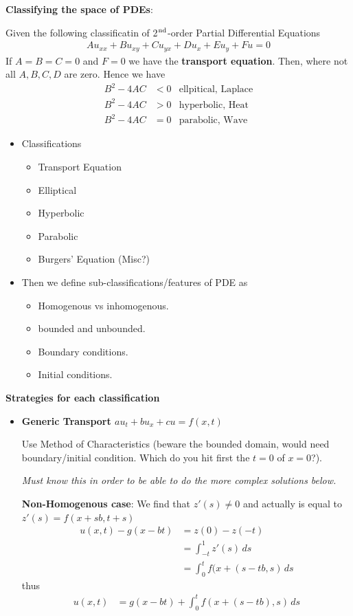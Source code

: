 \documentclass[12pt,a4paper]{report}
\begin{document}
{\begin{description}
	\textbf{Classifying the space of PDEs}:

Given the following classificatin of 2$\textsuperscript{nd}$-order Partial Differential Equations
\begin{align*}
	Au_{xx}+Bu_{xy}+Cu_{yx}+Du_{x}+Eu_y+Fu=0
	\end{align*}If $A=B=C=0$ and $F=0$ we have the \textbf{transport equation}.  Then, where not all $A,B,C,D$ are zero.  Hence we have
\begin{align*}
	B^2-4AC &<0 & \text{ellpitical, Laplace} \\
	B^2-4AC &>0 & \text{hyperbolic, Heat} \\
	B^2-4AC &=0 & \text{parabolic, Wave} 
\end{align*}

\begin{itemize}

\item Classifications
\begin{itemize}
	\item Transport Equation
	\item Elliptical
	\item Hyperbolic
	\item Parabolic
	\item Burgers' Equation (Misc?)
\end{itemize}

\item Then we define sub-classifications/features of PDE as
\begin{itemize}
	\item Homogenous vs inhomogenous.
	\item bounded and unbounded.
	\item Boundary conditions.
	\item Initial conditions.
\end{itemize}

\end{itemize}
	\textbf{Strategies for each classification}
	\begin{itemize}
		\item \textbf{Generic Transport $au_t+bu_x+ cu=f(x,t)$}
		
		Use Method of Characteristics (beware the bounded domain, would need boundary/initial condition.  Which do you hit first the $t=0$ of $x=0$?).
		
		\textit{Must know this in order to be able to do the more complex solutions below.}
		
		\textbf{Non-Homogenous case}: We find that $z'(s) \ne 0$ and actually is equal to $z'(s) = f(x+sb, t+s)$
	\begin{align*}
		u(x,t)-g(x-bt) &= z(0)-z(-t)\\
		&= \int_{-t}^1 z'(s)\, ds \\
		&= \int_0^t f(x+(s-tb,s)\,ds
	\end{align*}thus
	\begin{align*}
		u(x,t) &= g(x-bt) +\int_0^t f(x+(s-tb),s)\,ds
	\end{align*}
		

\end{itemize}
\end{description}}
\end{document}
